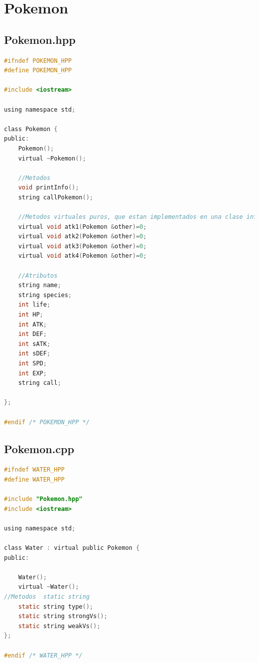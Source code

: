 \documentclass[11pt]{article}
\begin{document}
\begin{itemize}
    
    \end{itemize}










\section{Pokemon}
\subsection{Pokemon.hpp}

\begin{lstlisting}[language=C]
#ifndef POKEMON_HPP
#define POKEMON_HPP

#include <iostream>

using namespace std;

class Pokemon {
public:
    Pokemon();
    virtual ~Pokemon();
   
    //Metodos
    void printInfo();
    string callPokemon();
    
    //Metodos virtuales puros, que estan implementados en una clase inferior
    virtual void atk1(Pokemon &other)=0;
    virtual void atk2(Pokemon &other)=0;
    virtual void atk3(Pokemon &other)=0;
    virtual void atk4(Pokemon &other)=0;

    //Atributos
    string name;
    string species;
    int life;
    int HP;
    int ATK;
    int DEF;
    int sATK;
    int sDEF;
    int SPD;
    int EXP;
    string call; 
   
};

#endif /* POKEMON_HPP */
\end{lstlisting}



\subsection{Pokemon.cpp}

\begin{lstlisting}[language=C]
#ifndef WATER_HPP
#define WATER_HPP

#include "Pokemon.hpp"
#include <iostream>

using namespace std;

class Water : virtual public Pokemon {
public:

    Water();
    virtual ~Water();
//Metodos  static string
    static string type();
    static string strongVs();
    static string weakVs();
};

#endif /* WATER_HPP */

\end{lstlisting}
\end{document}
